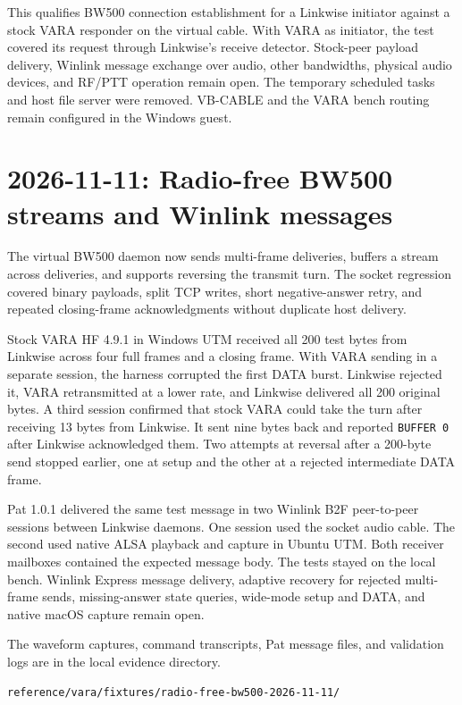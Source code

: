 \documentclass[11pt,a4paper]{article}
\begin{document}
This qualifies BW500 connection establishment for a Linkwise initiator
against a stock VARA responder on the virtual cable. With VARA as initiator,
the test covered its request through Linkwise's receive detector. Stock-peer
payload delivery, Winlink message exchange over audio, other bandwidths,
physical audio devices, and RF/PTT operation remain open. The temporary
scheduled tasks and host file server were removed. VB-CABLE and the VARA
bench routing remain configured in the Windows guest.

\section{2026-11-11: Radio-free BW500 streams and Winlink messages}

The virtual BW500 daemon now sends multi-frame deliveries, buffers a
stream across deliveries, and supports reversing the transmit turn.
The socket regression covered binary payloads, split TCP writes, short
negative-answer retry, and repeated closing-frame acknowledgments without
duplicate host delivery.

Stock VARA HF 4.9.1 in Windows UTM received all 200 test bytes from
Linkwise across four full frames and a closing frame. With VARA sending
in a separate session, the harness corrupted the first DATA burst.
Linkwise rejected it, VARA retransmitted at a lower rate, and Linkwise
delivered all 200 original bytes. A third session confirmed that stock
VARA could take the turn after receiving 13 bytes from Linkwise. It sent
nine bytes back and reported \texttt{BUFFER 0} after Linkwise acknowledged
them. Two attempts at reversal after a 200-byte send stopped earlier,
one at setup and the other at a rejected intermediate DATA frame.

Pat 1.0.1 delivered the same test message in two Winlink B2F peer-to-peer
sessions between Linkwise daemons. One session used the socket audio cable.
The second used native ALSA playback and capture in Ubuntu UTM. Both
receiver mailboxes contained the expected message body. The tests stayed
on the local bench. Winlink Express message delivery, adaptive recovery
for rejected multi-frame sends, missing-answer state queries, wide-mode
setup and DATA, and native macOS capture remain open.

The waveform captures, command transcripts, Pat message files, and
validation logs are in the local evidence directory.

\begin{lstlisting}
reference/vara/fixtures/radio-free-bw500-2026-11-11/
\end{lstlisting}
\end{document}

